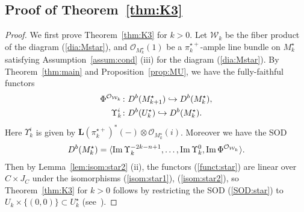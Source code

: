 \documentclass[11pt]{amsart}
\theoremstyle{plain}
\newcommand{\oO}{\mathcal{O}}
\newcommand{\wW}{\mathcal{W}}
\newcommand{\dL}{\mathbf{L}}
\newcommand{\Imm}{\mathop{\rm Im}\nolimits}
\begin{document}
\subsection{Proof of Theorem~\ref{thm:K3}}\label{subsec:proofK3}
\begin{proof}
We first prove Theorem~\ref{thm:K3} for $k>0$. 
Let $\wW_k$ be the fiber product of the diagram (\ref{dia:Mstar}), and 
$\oO_{M_k^{\star}}(1)$ be 
a $\pi_k^{\star+}$-ample line bundle on $M_k^{\star}$
satisfying Assumption~\ref{assum:cond} (iii)
for the diagram (\ref{dia:Mstar}). 
By Theorem~\ref{thm:main} and Proposition~\ref{prop:MU}, 
we have the fully-faithful functors
\begin{align}\label{funct:star}
\Phi^{\oO_{\wW_k}}
&\colon D^b(M_{k+1}^{\star}) \hookrightarrow D^b(M_k^{\star}), \\
\notag
\Upsilon^{i}_k &\colon 
D^b(U_k^{\star}) \hookrightarrow D^b(M_k^{\star}).
\end{align}
Here $\Upsilon^{i}_k$ is given by 
$\dL(\pi_k^{\star+})^{\ast}(-) \otimes \oO_{M_k^{\star}}(i)$. 
Moreover we have the SOD
\begin{align}\label{SOD:star}
D^b(M_k^{\star})=\langle \Imm \Upsilon^{-2k-n+1}_k, \ldots, 
\Imm \Upsilon^{0}_k, \Imm 
\Phi^{\oO_{\wW_k}} \rangle.
\end{align}
Then by Lemma~\ref{lem:isom:star2} (ii), 
the functors (\ref{funct:star})
are linear over $C \times J_C$ under the 
isomorphisms (\ref{isom:star1}), (\ref{isom:star2}), 
so Theorem~\ref{thm:K3} for $k>0$
follows by 
restricting the
SOD (\ref{SOD:star})
to $U_k \times \{(0, 0)\} \subset U_k^{\star}$
(see~\cite[Proposition~5.1, Theorem~6.4]{MR2801403}). 


\end{proof}
\end{document}
